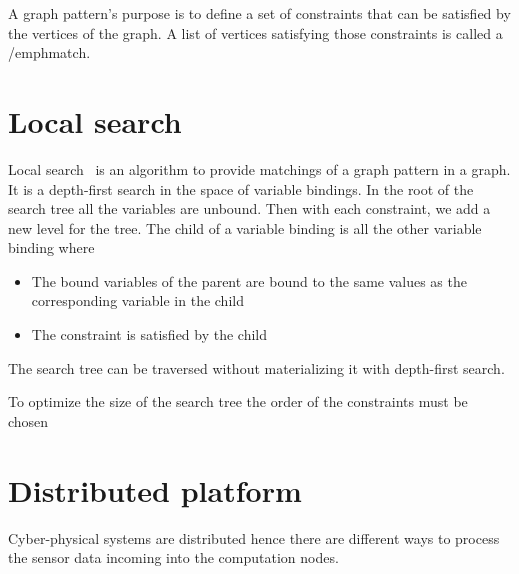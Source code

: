 A graph pattern's purpose is to define a set of constraints that can be satisfied by the vertices of the graph. A list of vertices satisfying those constraints is called a /emph{match}.

\section{Local search}

Local search~\cite{bur-marton-msc} is an algorithm to provide matchings of a graph pattern in a graph. It is a depth-first search in the space of variable bindings. In the root of the search tree all the variables are unbound. Then with each constraint, we add a new level for the tree. The child of a variable binding is all the other variable binding where 
\begin{itemize}
	\item The bound variables of the parent are bound to the same values as the corresponding variable in the child
	\item The constraint is satisfied by the child
\end{itemize}

The search tree can be traversed without materializing it with depth-first search. 

To optimize the size of the search tree the order of the constraints must be chosen 

\section{Distributed platform}


Cyber-physical systems are distributed hence there are different ways to process the sensor data incoming into the computation nodes. 






